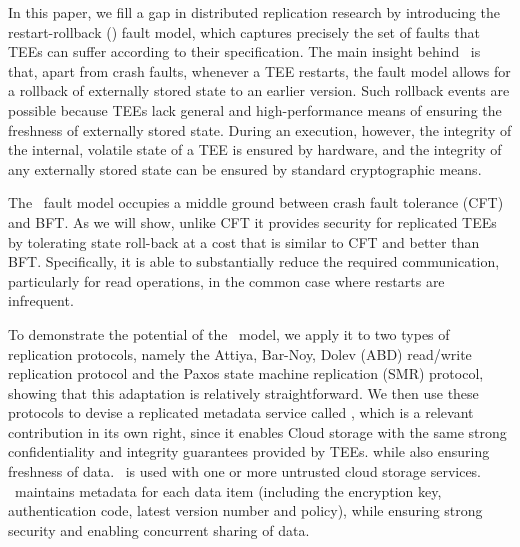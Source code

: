In this paper, we fill a gap in distributed replication research by
introducing the restart-rollback (\faultmodel) fault model, which
captures precisely the set of faults that \acp{TEE} can suffer according to
their specification.  The main insight behind \faultmodel\ is that,
apart from crash faults, whenever a \ac{TEE} restarts, the fault model
allows for a rollback of externally stored state to an earlier
version.  Such rollback events are possible because \acp{TEE} lack general
and high-performance means of ensuring the freshness of externally
stored state.  During an execution, however, the integrity of the
internal, volatile state of a \ac{TEE} is ensured by hardware, and the
integrity of any externally stored state can be ensured by standard
cryptographic means.

The \faultmodel\ fault model occupies a middle ground between crash
fault tolerance (CFT) and BFT. As we will show, unlike CFT it provides
security for replicated \acp{TEE} by tolerating state roll-back at a cost
that is similar to CFT and better than BFT. Specifically, it is able
to substantially reduce the required communication, particularly for
read operations, in the common case where restarts are
infrequent.

To demonstrate the potential of the \faultmodel\ model, we apply it to
two types of replication protocols, namely the Attiya, Bar-Noy, Dolev
(ABD) read/write replication protocol and the Paxos
state machine replication (SMR)
protocol, showing that this adaptation is relatively straightforward.
We then use these protocols to devise a replicated metadata service
called \sys, which is a relevant contribution in its own right, since
it enables Cloud storage with the same strong confidentiality and
integrity guarantees provided by \acp{TEE}. while also ensuring freshness
of data.
\sys\ is used with one or more untrusted cloud storage
services. \sys\ maintains metadata for each data item (including the
encryption key, authentication code, latest version number and
policy), while ensuring strong security and enabling concurrent
sharing of data.

